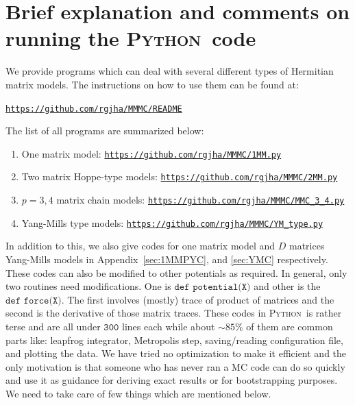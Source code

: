 \documentclass[letter,11pt]{article}
\newcommand{\PY}{\textsc{Python}}
\begin{document}
\section{\label{sec:BEOC}Brief explanation and comments on 
running the \PY~code}
We provide programs which can deal with several different types of Hermitian matrix models. The instructions on how to use them can be found at:  
\begin{center} \texttt{\href{https://github.com/rgjha/MMMC\#readme}{https://github.com/rgjha/MMMC/README}} \end{center}
 The list of all programs are summarized below:
\begin{enumerate}
	\item One matrix model: \texttt{\href{https://github.com/rgjha/MMMC/1MM.py}{https://github.com/rgjha/MMMC/1MM.py}}
	\item Two matrix Hoppe-type models: \texttt{\href{https://github.com/rgjha/MMMC/2MM.py}{https://github.com/rgjha/MMMC/2MM.py}}  
	\item $p=3,4$ matrix chain models: \texttt{\href{https://github.com/rgjha/MMMC/MMC_3_4.py}{https://github.com/rgjha/MMMC/MMC\_3\_4.py}}
	\item Yang-Mills type models: \texttt{\href{https://github.com/rgjha/MMMC/YM_type.py}{https://github.com/rgjha/MMMC/YM\_type.py}}
\end{enumerate}
In addition to this, we also give codes for one matrix model and $D$ matrices Yang-Mills models in Appendix~\ref{sec:1MMPYC}, and \ref{sec:YMC} respectively.
These codes can also be modified to other potentials as required. In general, only two routines need modifications. 
One is $\texttt{def potential(X)}$ and other is the $\texttt{def force(X)}$. 
The first involves (mostly) trace of product of matrices and the second is the 
derivative of those matrix traces. 
These codes in \PY~is rather terse
and are all under $\texttt{300}$ lines each
while about $\sim 85\%$ of them are common parts like:
leapfrog integrator, Metropolis step, saving/reading configuration file, 
and plotting the data. We have tried no optimization to make it efficient and the
only motivation is that someone who has never ran a MC code can do
so quickly and use it as guidance for deriving exact results or for
bootstrapping purposes. We need to take care of few things which are 
mentioned below.  
\end{document}
